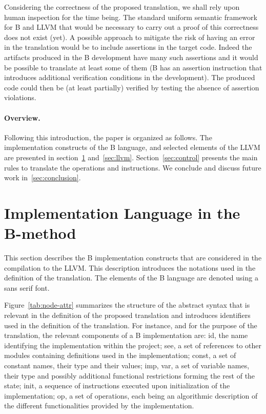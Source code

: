 \documentclass{llncs}
\newcommand{\B}[1]{\textsf{#1}}
\begin{document}
Considering the correctness of the proposed translation, we shall rely upon
human inspection for the time being. The standard uniform semantic framework for
B and LLVM that would be necessary to carry out a proof of this correctness does
not exist (yet). A possible approach to mitigate the risk of having an error in
the translation would be to include assertions in the target code. Indeed the
artifacts produced in the B development have many such assertions and it would
be possible to translate at least some of them (B has an assertion instruction
that introduces additional verification conditions in the development). The
produced code could then be (at least partially) verified by testing the absence
of assertion violations.

\paragraph{Overview.} Following this introduction, the paper is organized as
follows. The implementation constructs of the B language, and selected elements
of the LLVM are presented in section~\ref{sec:b-impl} and~\ref{sec:llvm}.
Section~\ref{sec:control} presents the main rules to translate the operations and
instructions. We conclude and discuss future work in~\ref{sec:conclusion}.

\section{Implementation Language in the B-method}
\label{sec:b-impl}

This section describes the B implementation constructs that are considered in
the compilation to the LLVM. This description introduces the notations used in
the definition of the translation. The elements of the B language are denoted
using a \B{sans serif} font. 

Figure~\ref{tab:node-attr} summarizes the structure
of the abstract syntax that is relevant in the definition of the proposed
translation and introduces identifiers used in the definition of the
translation. For instance, and for the purpose of the translation, the relevant
components of a B implementation are: \B{id}, the name identifying the
implementation within the project; \B{see}, a set of references to other modules
containing definitions used in the implementation; \B{const}, a set of constant
names, their type and their values; \B{imp},%
\B{var}, a set of variable names, their type and possibly
additional functional restrictions forming the rest of the state; \B{init}, a
sequence of instructions executed upon initialization of the implementation;
\B{op}, a set of operations, each being an algorithmic description of the
different functionalities provided by the implementation.
\end{document}
